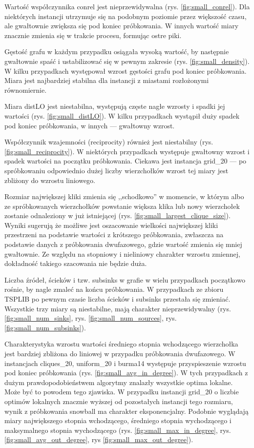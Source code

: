 Wartość współczynnika conrel jest nieprzewidywalna (rys. \ref{fig:small_conrel}).
Dla niektórych instancji utrzymuje się na podobnym poziomie przez większość czasu,
ale gwałtownie zwiększa się pod koniec próbkowania.
W innych wartość miary znacznie zmienia się w trakcie procesu, formując ostre piki.

Gęstość grafu w każdym przypadku osiągała wysoką wartość, by następnie gwałtownie spaść i ustabilizować się w pewnym zakresie (rys. \ref{fig:small_density}).
W kilku przypadkach występował wzrost gęstości grafu pod koniec próbkowania.
Miara jest najbardziej stabilna dla instancji z miastami rozłożonymi równomiernie.

Miara distLO jest niestabilna, występują częste nagłe wzrosty i spadki jej wartości (rys. \ref{fig:small_distLO}).
W kilku przypadkach wystąpił duży spadek pod koniec próbkowania, w innych --- gwałtowny wzrost.

Współczynnik wzajemności (reciprocity) również jest niestabilny (rys. \ref{fig:small_reciprocity}).
W niektórych przypadkach występuje gwałtowny wzrost i spadek wartości na początku próbkowania.
Ciekawa jest instancja grid\_20 --- po spróbkowaniu odpowiednio dużej liczby wierzchołków
wzrost tej miary jest zbliżony do wzrostu liniowego.

Rozmiar największej kliki zmienia się ,,schodkowo'' w momencie, w którym albo ze spróbkowanych wierzchołków
powstanie większa klika lub nowy wierzchołek zostanie odnaleziony w już istniejącej (rys. \ref{fig:small_largest_clique_size}).
Wyniki sugerują że możliwe jest oszacowanie wielkości największej kliki przestrzeni na podstawie wartości
z krótszego próbkowania, zwłaszcza na podstawie danych z próbkowania dwufazowego, gdzie
wartość zmienia się mniej gwałtownie. Ze względu na stopniowy i nieliniowy charakter wzrostu zmiennej,
dokładność takiego szacowania nie będzie duża.

Liczba źródeł, ścieków i tzw. subsinks w grafie w wielu przypadkach początkowo rośnie, by nagle zmaleć na końcu próbkowania.
W przypadkach ze zbioru TSPLIB po pewnym czasie liczba ścieków i subsinks przestała się zmieniać.
Wszystkie trzy miary są niestabilne, mają charakter nieprzewidywalny (rys. \ref{fig:small_num_sinks}, rys. \ref{fig:small_num_sources}, rys. \ref{fig:small_num_subsinks}).

Charakterystyka wzrostu wartości średniego stopnia wchodzącego wierzchołka jest bardziej zbliżona do liniowej
w przypadku próbkowania dwufazowego. W instancjach cliques\_20, uniform\_20 i burma14 występuje
przyspieszenie wzrostu pod koniec próbkowania (rys. \ref{fig:small_avg_in_degree}).
W tych przypadkach z dużym prawdopodobieństwem algorytmy znalazły wszystkie optima lokalne.
Może być to powodem tego zjawiska.
W przypadku instancji grid\_20 o liczbie optimów lokalnych znacznie wyższej od pozostałych instancji tego rozmiaru,
wynik z próbkowania snowball ma charakter eksponencjalny.
Podobnie wyglądają miary największego stopnia wchodzącego, średniego stopnia wychodzącego i maksymalnego stopnia wychodzącego
(rys. \ref{fig:small_max_in_degree}, rys. \ref{fig:small_avg_out_degree}, rys \ref{fig:small_max_out_degree}).

